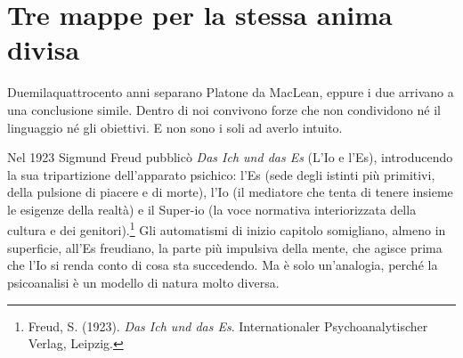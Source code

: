 \section{Tre mappe per la stessa anima divisa}

Duemilaquattrocento anni separano Platone da MacLean, eppure i due arrivano a una conclusione simile. Dentro di noi convivono forze che non condividono né il linguaggio né gli obiettivi. E non sono i soli ad averlo intuito.

Nel 1923 Sigmund Freud pubblicò \textit{Das Ich und das Es} (L'Io e l'Es), introducendo la sua tripartizione dell'apparato psichico: l'Es (sede degli istinti più primitivi, della pulsione di piacere e di morte), l'Io (il mediatore che tenta di tenere insieme le esigenze della realtà) e il Super-io (la voce normativa interiorizzata della cultura e dei genitori).\footnote{Freud, S. (1923). \textit{Das Ich und das Es}. Internationaler Psychoanalytischer Verlag, Leipzig.} Gli automatismi di inizio capitolo somigliano, almeno in superficie, all'Es freudiano, la parte più impulsiva della mente, che agisce prima che l'Io si renda conto di cosa sta succedendo. Ma è solo un'analogia, perché la psicoanalisi è un modello di natura molto diversa.

